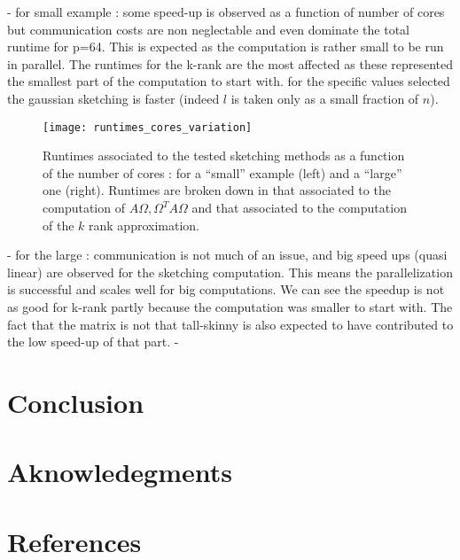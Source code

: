 \documentclass[a4paper, 12pt,oneside]{article}
\begin{document}
		- for small example : some speed-up is observed as a function of number of cores but communication costs are non neglectable and even dominate the total runtime for p=64. This is expected as the computation is rather small to be run in parallel. The runtimes for the k-rank are the most affected as these represented the smallest part of the computation to start with. for the specific values selected the gaussian sketching is faster (indeed $l$ is taken only as a small fraction of $n$).

		\begin{figure}[htb]       
			\centering             
				\vspace{0em}
				\texttt{[image: runtimes\_cores\_variation]}
				\caption{Runtimes associated to the tested sketching methods as a function of the number of cores : for a ``small'' example (left) and a ``large'' one (right). Runtimes are broken down in that associated to the computation of $A\Omega,\Omega^T A\Omega$ and that associated to the computation of the $k$ rank approximation.}
				\label{fig:runtimes-cores-variation}
		\end{figure}
		- for the large : communication is not much of an issue, and big speed ups (quasi linear) are observed for the sketching computation. This means the parallelization is successful and scales well for big computations. We can see the speedup is not as good for k-rank partly because the computation was smaller to start with. The fact that the matrix is not that tall-skinny is also expected to have contributed to the low speed-up of that part.
		- 

	\section{Conclusion}
	\section*{Aknowledegments}
	\section*{References}
\end{document}
